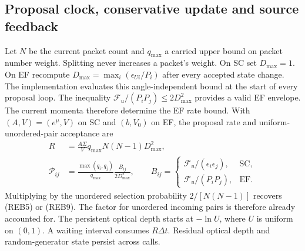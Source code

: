 \subsection{Proposal clock, conservative update and source feedback}

Let \(N\) be the current packet count and \(q_{\max}\) a carried upper
bound on packet number weight. Splitting never increases a packet's
weight. On SC set \(D_{\max}=1\). On EF recompute
\(D_{\max}=\max_i(\epsilon_{Ui}/P_i)\) after every accepted state
change. The implementation evaluates this angle-independent bound at
the start of every proposal loop. The inequality
\(\mathcal F_u/(P_iP_j)\leq2D_{\max}^2\) provides a valid EF
envelope. The current momenta therefore determine the EF rate bound.
With \((A,V)=(e^\mu,V)\) on SC and \((b,V_0)\) on EF, the proposal
rate and uniform-unordered-pair acceptance are
\[
 \begin{split}
 R&=\frac{A\Sigma}{V}q_{\max}N(N-1)D_{\max}^2,\\
 \mathcal P_{ij}&=\frac{\max(q_i,q_j)}{q_{\max}}
       \frac{B_{ij}}{2D_{\max}^2},\qquad
 B_{ij}=\begin{cases}
  \mathcal F_u/(\epsilon_i\epsilon_j),&\mathrm{SC},\\
  \mathcal F_u/(P_iP_j),&\mathrm{EF}.
 \end{cases}
 \end{split}\tag{REB12}
\]
Multiplying by the unordered selection probability \(2/[N(N-1)]\)
recovers (REB5) or (REB9). The factor for unordered incoming pairs is
therefore already accounted for. The persistent optical depth starts at
\(-\ln U\), where \(U\) is uniform on \((0,1)\). A waiting interval
consumes \(R\Delta t\). Residual optical depth and random-generator
state persist across calls.

